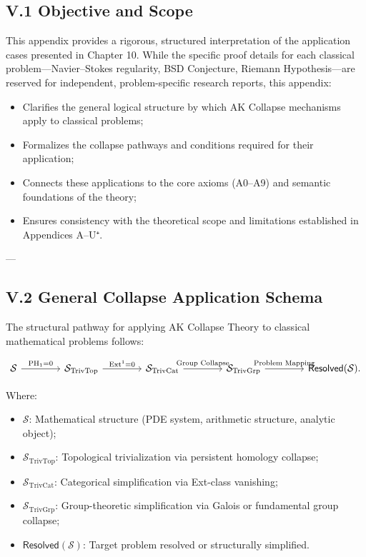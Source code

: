 \documentclass[11pt]{article}
\begin{document}
\subsection*{V.1 Objective and Scope}

This appendix provides a rigorous, structured interpretation of the application cases presented in Chapter 10.  
While the specific proof details for each classical problem—Navier–Stokes regularity, BSD Conjecture, Riemann Hypothesis—are reserved for independent, problem-specific research reports, this appendix:

\begin{itemize}
    \item Clarifies the general logical structure by which AK Collapse mechanisms apply to classical problems;
    \item Formalizes the collapse pathways and conditions required for their application;
    \item Connects these applications to the core axioms (A0–A9) and semantic foundations of the theory;
    \item Ensures consistency with the theoretical scope and limitations established in Appendices A–U⁺.
\end{itemize}

---

\subsection*{V.2 General Collapse Application Schema}

The structural pathway for applying AK Collapse Theory to classical mathematical problems follows:

\[
\begin{tikzcd}[column sep=4em]
\mathcal{S} \arrow[r, "\mathrm{PH}_1 = 0"]
& \mathcal{S}_{\mathrm{TrivTop}} \arrow[r, "\mathrm{Ext}^1 = 0"]
& \mathcal{S}_{\mathrm{TrivCat}} \arrow[r, "\text{Group Collapse}"]
& \mathcal{S}_{\mathrm{TrivGrp}} \arrow[r, "\text{Problem Mapping}"]
& \mathsf{Resolved}(\mathcal{S}).
\end{tikzcd}
\]

Where:
\begin{itemize}
    \item $\mathcal{S}$: Mathematical structure (PDE system, arithmetic structure, analytic object);
    \item $\mathcal{S}_{\mathrm{TrivTop}}$: Topological trivialization via persistent homology collapse;
    \item $\mathcal{S}_{\mathrm{TrivCat}}$: Categorical simplification via Ext-class vanishing;
    \item $\mathcal{S}_{\mathrm{TrivGrp}}$: Group-theoretic simplification via Galois or fundamental group collapse;
    \item $\mathsf{Resolved}(\mathcal{S})$: Target problem resolved or structurally simplified.
\end{itemize}
\end{document}
